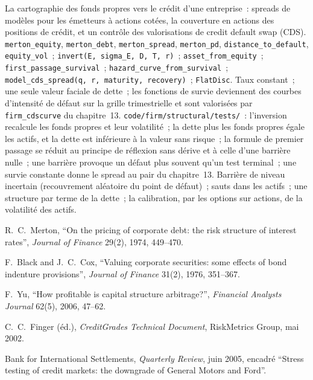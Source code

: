 \begin{build}
 La cartographie des fonds propres vers le crédit d'une entreprise~: spreads de modèles pour les émetteurs à actions cotées,
la couverture en actions des positions de crédit, et un contrôle des valorisations de credit default swap (CDS).
 \texttt{merton\_equity}, \texttt{merton\_debt}, \texttt{merton\_spread},
\texttt{merton\_pd}, \texttt{distance\_to\_default}, \texttt{equity\_vol}~; \texttt{invert(E,
sigma\_E, D, T, r)}~; \texttt{asset\_from\_equity}~; \texttt{first\_passage\_survival}~;
\texttt{hazard\_curve\_from\_survival}~; \texttt{model\_cds\_spread(q, r, maturity,
recovery)}~; \texttt{FlatDisc}.
 Taux constant~; une seule valeur faciale de dette~; les fonctions de survie deviennent des courbes d'intensité de défaut sur la
grille trimestrielle et sont valorisées par \texttt{firm\_cdscurve} du chapitre~13.
 \texttt{code/firm/structural/tests/}~: l'inversion recalcule
les fonds propres et leur volatilité~; la dette plus les fonds propres égale les actifs, et la dette est inférieure à la
valeur sans risque~; la formule de premier passage se réduit au principe de réflexion sans dérive et à
celle d'une barrière nulle~; une barrière provoque un défaut plus souvent qu'un test terminal~; une
survie constante donne le spread au pair du chapitre~13.
 Barrière de niveau incertain (recouvrement aléatoire du point de défaut)~;
sauts dans les actifs~; une structure par terme de la dette~; la calibration, par les options sur actions, de la
volatilité des actifs.
\end{build}

\begin{omsources}
\item R.\ C.\ Merton, ``On the pricing of corporate debt: the risk structure of interest
rates'', \emph{Journal of Finance} 29(2), 1974, 449--470.
\item F.\ Black and J.\ C.\ Cox, ``Valuing corporate securities: some effects of bond
indenture provisions'', \emph{Journal of Finance} 31(2), 1976, 351--367.
\item F.\ Yu, ``How profitable is capital structure arbitrage?'', \emph{Financial Analysts
Journal} 62(5), 2006, 47--62.
\item C.\ C.\ Finger (éd.), \emph{CreditGrades Technical Document}, RiskMetrics Group, mai 2002.
\item Bank for International Settlements, \emph{Quarterly Review}, juin 2005, encadré ``Stress
testing of credit markets: the downgrade of General Motors and Ford''.
\end{omsources}


